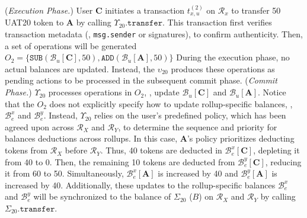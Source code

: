 (\emph{Execution Phase.}) User \textbf{C} initiates a transaction $t^{(2)}_{x,u}$ on $\mathcal{R}_x$ to transfer 50 UAT20 token to \textbf{A} by calling $\Upsilon_{20}.\mathtt{transfer}$.
This transaction first verifies transaction metadata (\ie, \texttt{msg.sender} or signatures), to confirm authenticity.
Then, a set of operations will be generated 
$O_2=\{\mathtt{SUB}(\mathcal{B}_u[\mathbf{C}],50), \mathtt{ADD}(\mathcal{B}_u[\mathbf{A}],50)\}$
During the execution phase, no actual balances are updated. Instead, the $\upsilon_{20}$ produces these operations as pending actions to be processed in the subsequent commit phase. 
(\emph{Commit Phase.}) $\mathcal{\Upsilon}_{20}$ processes operations in $O_2$, \ie, update $\mathcal{B}_u[\mathbf{C}]$ and $\mathcal{B}_u[\mathbf{A}]$. Notice that the $O_2$ does not explicitly specify how to update rollup-specific balances, \eg, $\mathcal{B}^x_e$ and $\mathcal{B}^y_e$.
 Instead, $\Upsilon_{20}$ relies on the user's predefined policy, which has been agreed upon across $\mathcal{R}_X$ and $\mathcal{R}_Y$, to determine the sequence and priority for balances deductions across rollups. In this case, $\mathbf{A}$’s policy prioritizes deducting tokens from $\mathcal{R}_X$ before $\mathcal{R}_Y$.
 Thus, 40 tokens are deducted in $\mathcal{B}^x_e[\mathbf{C}]$, depleting it from 40 to 0. Then, the remaining 10 tokens are deducted from $\mathcal{B}^y_e[\mathbf{C}]$, reducing it from 60 to 50. Simultaneously, $\mathcal{B}^x_e[\mathbf{A}]$ is increased by 40 and $\mathcal{B}^y_e[\mathbf{A}]$ is increased by 40.
 Additionally, these updates to the rollup-specific balances $\mathcal{B}^x_e$ and $\mathcal{B}^y_e$ will be synchronized to the balance of $\Sigma_{20}$ ($B$) on $\mathcal{R}_X$ and $\mathcal{R}_Y$ by calling $\Sigma_{20}.\mathtt{transfer}$.


